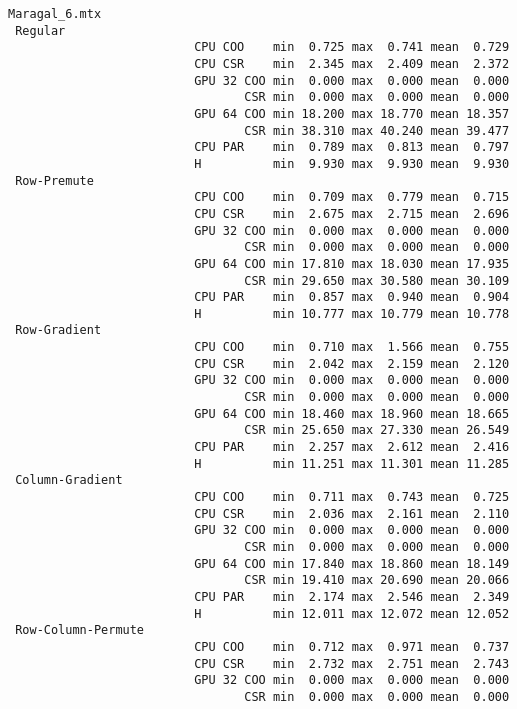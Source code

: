 \begin{verbatim}
Maragal_6.mtx
 Regular
                          CPU COO    min  0.725 max  0.741 mean  0.729
                          CPU CSR    min  2.345 max  2.409 mean  2.372
                          GPU 32 COO min  0.000 max  0.000 mean  0.000
                                 CSR min  0.000 max  0.000 mean  0.000
                          GPU 64 COO min 18.200 max 18.770 mean 18.357
                                 CSR min 38.310 max 40.240 mean 39.477
                          CPU PAR    min  0.789 max  0.813 mean  0.797
                          H          min  9.930 max  9.930 mean  9.930
 Row-Premute
                          CPU COO    min  0.709 max  0.779 mean  0.715
                          CPU CSR    min  2.675 max  2.715 mean  2.696
                          GPU 32 COO min  0.000 max  0.000 mean  0.000
                                 CSR min  0.000 max  0.000 mean  0.000
                          GPU 64 COO min 17.810 max 18.030 mean 17.935
                                 CSR min 29.650 max 30.580 mean 30.109
                          CPU PAR    min  0.857 max  0.940 mean  0.904
                          H          min 10.777 max 10.779 mean 10.778
 Row-Gradient
                          CPU COO    min  0.710 max  1.566 mean  0.755
                          CPU CSR    min  2.042 max  2.159 mean  2.120
                          GPU 32 COO min  0.000 max  0.000 mean  0.000
                                 CSR min  0.000 max  0.000 mean  0.000
                          GPU 64 COO min 18.460 max 18.960 mean 18.665
                                 CSR min 25.650 max 27.330 mean 26.549
                          CPU PAR    min  2.257 max  2.612 mean  2.416
                          H          min 11.251 max 11.301 mean 11.285
 Column-Gradient
                          CPU COO    min  0.711 max  0.743 mean  0.725
                          CPU CSR    min  2.036 max  2.161 mean  2.110
                          GPU 32 COO min  0.000 max  0.000 mean  0.000
                                 CSR min  0.000 max  0.000 mean  0.000
                          GPU 64 COO min 17.840 max 18.860 mean 18.149
                                 CSR min 19.410 max 20.690 mean 20.066
                          CPU PAR    min  2.174 max  2.546 mean  2.349
                          H          min 12.011 max 12.072 mean 12.052
 Row-Column-Permute
                          CPU COO    min  0.712 max  0.971 mean  0.737
                          CPU CSR    min  2.732 max  2.751 mean  2.743
                          GPU 32 COO min  0.000 max  0.000 mean  0.000
                                 CSR min  0.000 max  0.000 mean  0.000

\end{verbatim}
